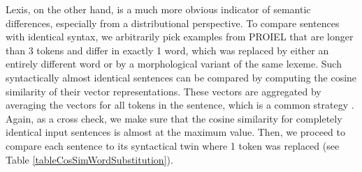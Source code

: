 \documentclass[oneside]{book}
\begin{document}
Lexis, on the other hand, is a much more obvious indicator of semantic differences, especially from a distributional perspective. To compare sentences with identical syntax, we arbitrarily pick examples from PROIEL that are longer than 3 tokens and differ in exactly 1 word, which was replaced by either an entirely different word or by a morphological variant of the same lexeme. Such syntactically almost identical sentences can be compared by computing the cosine similarity of their vector representations. These vectors are aggregated by averaging the vectors for all tokens in the sentence, which is a common strategy \parencite[1]{adiFinegrainedAnalysisSentence2016}. Again, as a cross check, we make sure that the cosine similarity for completely identical input sentences is almost at the maximum value. Then, we proceed to compare each sentence to its syntactical twin where 1 token was replaced (see Table \ref{tableCosSimWordSubstitution}).
\end{document}
